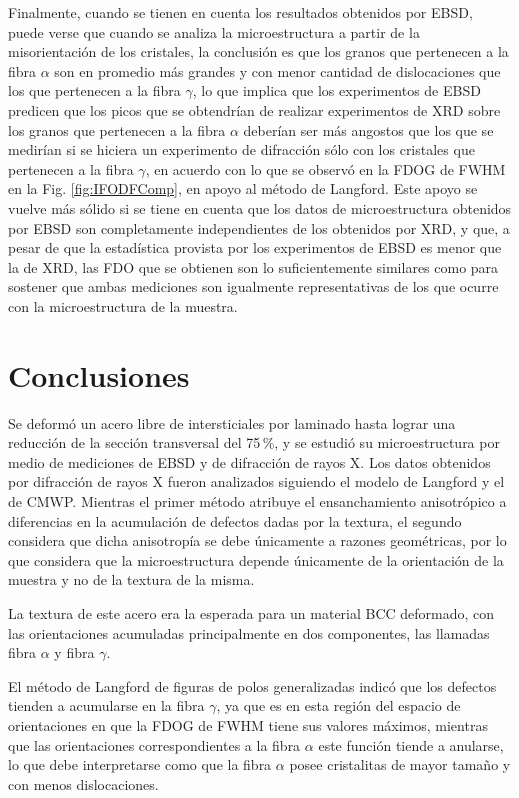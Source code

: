 Finalmente, cuando se tienen en cuenta los resultados obtenidos por EBSD, puede verse que cuando se analiza la microestructura a partir de la misorientación de los cristales, la conclusión es que los granos que pertenecen a la fibra $\alpha$ son en promedio más grandes y con menor cantidad de dislocaciones que los que pertenecen a la fibra $\gamma$, lo que implica que los experimentos de EBSD predicen que los picos que se obtendrían de realizar experimentos de XRD sobre los granos que pertenecen a la fibra $\alpha$ deberían ser más angostos que los que se medirían si se hiciera un experimento de difracción sólo con los cristales que pertenecen a la fibra $\gamma$, en acuerdo con lo que se observó en la FDOG de FWHM en la Fig. \ref{fig:IFODFComp}, en apoyo al método de Langford.
Este apoyo se vuelve más sólido si se tiene en cuenta que los datos de microestructura obtenidos por EBSD son completamente independientes de los obtenidos por XRD, y que, a pesar de que la estadística provista por los experimentos de EBSD es menor que la de XRD, las FDO que se obtienen son lo suficientemente similares como para sostener que ambas mediciones son igualmente representativas de los que ocurre con la microestructura de la muestra.

\section{Conclusiones}\label{S:IFConclusiones}
Se deformó un acero libre de intersticiales por laminado hasta lograr una reducción de la sección transversal del 75\,\%, y se estudió su microestructura por medio de mediciones de EBSD y de difracción de rayos X.
Los datos obtenidos por difracción de rayos X fueron analizados siguiendo el modelo de Langford y el de CMWP.
Mientras el primer método atribuye el ensanchamiento anisotrópico a diferencias en la acumulación de defectos dadas por la textura, el segundo considera que dicha anisotropía se debe únicamente a razones geométricas, por lo que considera que la microestructura depende únicamente de la orientación de la muestra y no de la textura de la misma.

La textura de este acero era la esperada para un material BCC deformado, con las orientaciones acumuladas principalmente en dos componentes, las llamadas fibra $\alpha$ y fibra $\gamma$.

El método de Langford de figuras de polos generalizadas indicó que los defectos tienden a acumularse en la fibra $\gamma$, ya que es en esta región del espacio de orientaciones en que la FDOG de FWHM tiene sus valores máximos, mientras que las orientaciones correspondientes a la fibra $\alpha$ este función tiende a anularse, lo que debe interpretarse como que la fibra $\alpha$ posee cristalitas de mayor tamaño y con menos dislocaciones.

